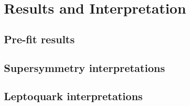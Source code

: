 \chapter{Results and Interpretation}

\section{Pre-fit results}

\section{Supersymmetry interpretations}

\section{Leptoquark interpretations}
